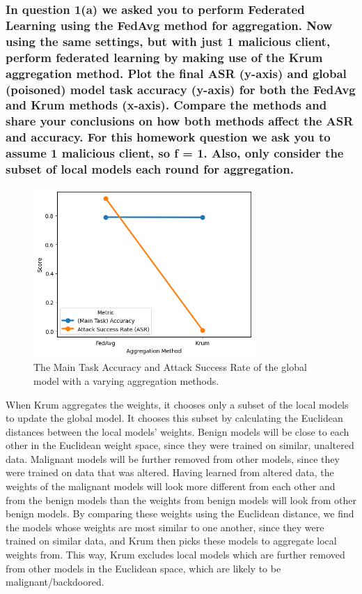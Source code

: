 \documentclass{article}
\begin{document}
\subsubsection{In question 1(a) we asked you to perform Federated Learning using
the FedAvg method for aggregation. Now using the same settings, but with just
1 malicious client, perform federated learning by making use of the Krum aggregation method. Plot the final ASR (y-axis) and global (poisoned) model task
accuracy (y-axis) for both the FedAvg and Krum methods (x-axis). Compare
the methods and share your conclusions on how both methods affect the ASR
and accuracy. For this homework question we ask you to assume 1 malicious
client, so f = 1. Also, only consider the subset of local models each round for
aggregation.}
\begin{figure}
    \centering
    \includegraphics[width=0.75\textwidth]{aggregation_method.png}
    \caption{The Main Task Accuracy and Attack Success Rate of the global model with a varying aggregation methods.}
    \label{fig:aggregation_method}
\end{figure}

When Krum aggregates the weights, it chooses only a subset of the local models to update the global model.
It chooses this subset by calculating the Euclidean distances between the local models' weights.
Benign models will be close to each other in the Euclidean weight space, since they were trained on similar, unaltered data.
Malignant models will be further removed from other models, since they were trained on data that was altered.
Having learned from altered data, the weights of the malignant models will look more different from each other and from the benign models than the weights from benign models will look from other benign models.
By comparing these weights using the Euclidean distance, we find the models whose weights are most similar to one another, since they were trained on similar data, and Krum then picks these models to aggregate local weights from.
This way, Krum excludes local models which are further removed from other models in the Euclidean space, which are likely to be malignant/backdoored.
\end{document}
